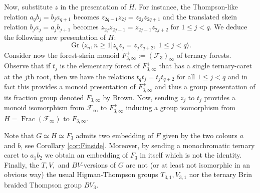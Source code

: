 \documentclass[a4paper, 12pt]{amsart}
\numberwithin{equation}{section}
\theoremstyle{definition}
\newcommand{\cF}{\mathcal F}
\DeclareMathOperator{\Frac}{Frac}
\DeclareMathOperator{\Gr}{Gr}
\begin{document}
Now, substitute $z$ in the presentation of $H$. 
For instance, the Thompson-like relation $a_q b_j=b_j a_{q+1}$ becomes $z_{2q-1} z_{2j} = z_{2j} z_{2q+1}$ and the translated skein relation $b_j a_j=a_j b_{j+1}$ becomes $z_{2j} z_{2j-1}=z_{2j-1} z_{2j+2}$ for $1\leq j<q.$
We deduce the following new presentation of $H$:
$$\Gr\langle z_n, n\geq 1 | z_q z_j = z_j z_{q+2}, \ 1\leq j<q\rangle.$$
Consider now the forest-skein monoid $F_{3,\infty}^+:=(\cF_3)_\infty$ of ternary forests. 
Observe that if $t_j$ is the elementary forest of $F_{3,\infty}^+$ that has a single ternary-caret at the $j$th root, then we have the relations $t_qt_j=t_j t_{q+2}$ for all $1\leq j<q$ and in fact this provides a monoid presentation of $F_{3,\infty}^+$ and thus a group presentation of its fraction group denoted $F_{3,\infty}$ by Brown.
Now, sending $z_j$ to $t_j$ provides a monoid isomorphism from $\cF_\infty$ to $F_{3,\infty}^+$ inducing a group isomorphism from $H=\Frac(\cF_\infty)$ to $F_{3,\infty}.$

Note that $G\simeq H\simeq F_{3}$ admits two embedding of $F$ given by the two colours $a$ and $b$, see Corollary \ref{cor:Finside}.
Moreover, by sending a monochromatic ternary caret to $a_1b_2$ we obtain an embedding of $F_3$ in itself which is not the identity.
Finally, the $T,V,$ and $BV$-versions of $G$ are not (or at least not isomorphic in an obvious way) the usual Higman-Thompson groups $T_{3,1}, V_{3,1}$  nor the ternary Brin braided Thompson group $BV_{3}$.
\end{document}

